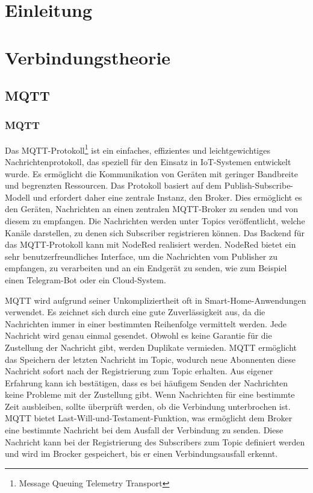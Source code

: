 \documentclass[12pt, letterpaper]{article}
\author{Oleksii Baida}
\date{Mai 2024}
\begin{document}


\tableofcontents
\pagebreak

\section{Einleitung}

\section{Verbindungstheorie}
\subsection{MQTT}
\subsubsection{MQTT}
\par Das MQTT-Protokoll\footnote[1]{Message Queuing Telemetry Transport} ist ein einfaches, effizientes und leichtgewichtiges Nachrichtenprotokoll, das speziell für den Einsatz in IoT-Systemen entwickelt wurde. Es ermöglicht die Kommunikation von Geräten mit geringer Bandbreite und begrenzten Ressourcen. Das Protokoll basiert auf dem Publish-Subscribe-Modell und erfordert daher eine zentrale Instanz, den Broker. Dies ermöglicht es den Geräten, Nachrichten an einen zentralen MQTT-Broker zu senden und von diesem zu empfangen. Die Nachrichten werden unter Topics veröffentlicht, welche Kanäle darstellen, zu denen sich Subscriber registrieren können. Das Backend für das MQTT-Protokoll kann mit NodeRed realisiert werden. NodeRed bietet ein sehr benutzerfreundliches Interface, um die Nachrichten vom Publisher zu empfangen, zu verarbeiten und an ein Endgerät zu senden, wie zum Beispiel einen Telegram-Bot oder ein Cloud-System.
\par MQTT wird aufgrund seiner Unkompliziertheit oft in Smart-Home-Anwendungen verwendet. Es zeichnet sich durch eine gute Zuverlässigkeit aus, da die Nachrichten immer in einer bestimmten Reihenfolge vermittelt werden. Jede Nachricht wird genau einmal gesendet. Obwohl es keine Garantie für die Zustellung der Nachricht gibt, werden Duplikate vermieden. MQTT ermöglicht das Speichern der letzten Nachricht im Topic, wodurch neue Abonnenten diese Nachricht sofort nach der Registrierung zum Topic erhalten. Aus eigener Erfahrung kann ich bestätigen, dass es bei häufigem Senden der Nachrichten keine Probleme mit der Zustellung gibt. Wenn Nachrichten für eine bestimmte Zeit ausbleiben, sollte überprüft werden, ob die Verbindung unterbrochen ist. MQTT bietet Last-Will-und-Testament-Funktion, was ermöglicht dem Broker eine bestimmte Nachricht bei dem Ausfall der Verbindung zu senden. Diese Nachricht kann bei der Registrierung des Subscribers zum Topic definiert werden und wird im Brocker gespeichert, bis er einen Verbindungsausfall erkennt.
\end{document}
